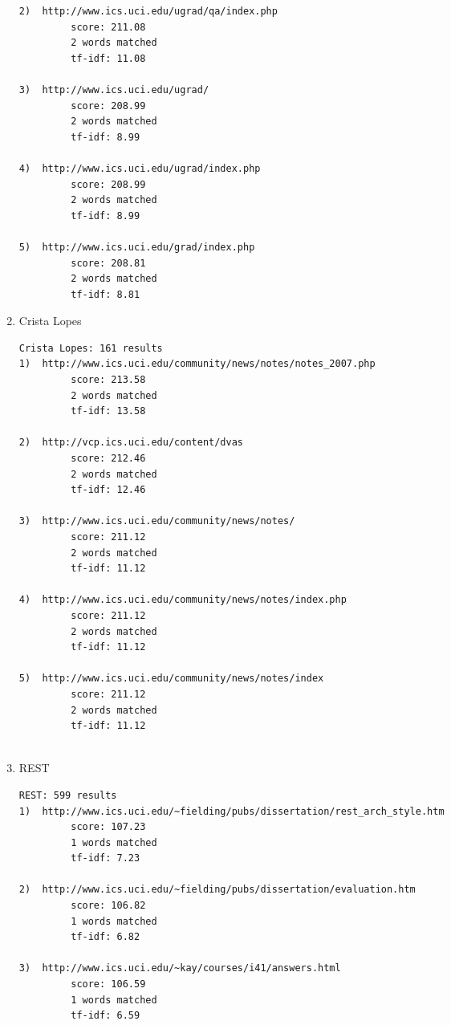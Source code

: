 \documentclass[paper=a4, fontsize=11pt]{scrartcl} %
\numberwithin{equation}{section} %
\numberwithin{table}{section} %
\begin{document}
\begin{enumerate}
\begin{small}
\begin{verbatim}
2)  http://www.ics.uci.edu/ugrad/qa/index.php 
         score: 211.08 
         2 words matched 
         tf-idf: 11.08

3)  http://www.ics.uci.edu/ugrad/ 
         score: 208.99 
         2 words matched 
         tf-idf: 8.99

4)  http://www.ics.uci.edu/ugrad/index.php 
         score: 208.99 
         2 words matched 
         tf-idf: 8.99

5)  http://www.ics.uci.edu/grad/index.php 
         score: 208.81 
         2 words matched 
         tf-idf: 8.81

\end{verbatim}
\end{small}

\item Crista Lopes
\begin{small}
\begin{verbatim}
Crista Lopes: 161 results
1)  http://www.ics.uci.edu/community/news/notes/notes_2007.php 
         score: 213.58 
         2 words matched 
         tf-idf: 13.58

2)  http://vcp.ics.uci.edu/content/dvas 
         score: 212.46 
         2 words matched 
         tf-idf: 12.46

3)  http://www.ics.uci.edu/community/news/notes/ 
         score: 211.12 
         2 words matched 
         tf-idf: 11.12

4)  http://www.ics.uci.edu/community/news/notes/index.php 
         score: 211.12 
         2 words matched 
         tf-idf: 11.12

5)  http://www.ics.uci.edu/community/news/notes/index 
         score: 211.12 
         2 words matched 
         tf-idf: 11.12


\end{verbatim}
\end{small}

\item REST
\begin{small}
\begin{verbatim}
REST: 599 results
1)  http://www.ics.uci.edu/~fielding/pubs/dissertation/rest_arch_style.htm 
         score: 107.23 
         1 words matched 
         tf-idf: 7.23

2)  http://www.ics.uci.edu/~fielding/pubs/dissertation/evaluation.htm 
         score: 106.82 
         1 words matched 
         tf-idf: 6.82

3)  http://www.ics.uci.edu/~kay/courses/i41/answers.html 
         score: 106.59 
         1 words matched 
         tf-idf: 6.59


\end{verbatim}
\end{small}
\end{enumerate}
\end{document}
